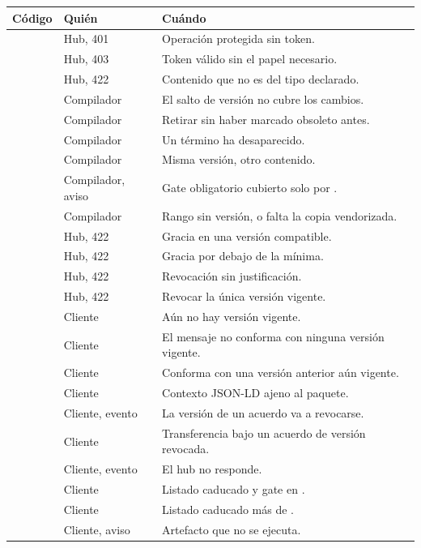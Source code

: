 \begin{longtable}{@{}L{6.9cm}L{2.5cm}L{6cm}@{}}
\toprule
\textbf{Código} & \textbf{Quién} & \textbf{Cuándo} \\
\midrule
\endhead
{} & Hub, 401 & Operación protegida sin token. \\
 & Hub, 403 & Token válido sin el papel necesario. \\
 & Hub, 422 & Contenido que no es del tipo declarado. \\
 & Compilador & El salto de versión no cubre los cambios. \\
 & Compilador & Retirar sin haber marcado obsoleto antes. \\
 & Compilador & Un término ha desaparecido. \\
 & Compilador & Misma versión, otro contenido. \\
 & Compilador, aviso & Gate obligatorio cubierto solo por . \\
 & Compilador & Rango sin versión, o falta la copia vendorizada. \\
 & Hub, 422 & Gracia en una versión compatible. \\
 & Hub, 422 & Gracia por debajo de la mínima. \\
 & Hub, 422 & Revocación sin justificación. \\
 & Hub, 422 & Revocar la única versión vigente. \\
 & Cliente & Aún no hay versión vigente. \\
 & Cliente & El mensaje no conforma con ninguna versión vigente. \\
 & Cliente & Conforma con una versión anterior aún vigente. \\
 & Cliente & Contexto JSON-LD ajeno al paquete. \\
 & Cliente, evento & La versión de un acuerdo va a revocarse. \\
 & Cliente & Transferencia bajo un acuerdo de versión revocada. \\
 & Cliente, evento & El hub no responde. \\
 & Cliente & Listado caducado y gate en . \\
 & Cliente & Listado caducado más de . \\
 & Cliente, aviso & Artefacto  que no se ejecuta. \\
\bottomrule
\end{longtable}

